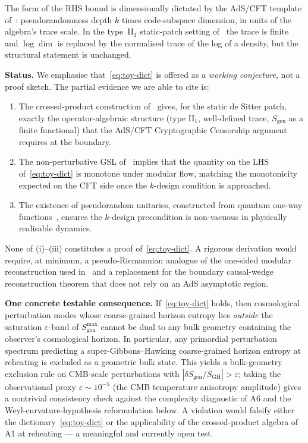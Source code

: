 \documentclass[epjc3,twocolumn]{svjour3}
\begin{document}
\noindent The form of the RHS bound is dimensionally dictated by the
AdS/CFT template of~\cite{CryptoCensorship}: pseudorandomness depth
$k$ times code-subspace dimension, in units of the algebra's trace
scale. In the type~II$_1$ static-patch setting of~\cite{CLPW2023} the
trace is finite and $\log\dim$ is replaced by the normalised trace
of the log of a density, but the structural statement is unchanged.

\medskip\noindent\textbf{Status.}\;
We emphasise that~\eqref{eq:toy-dict} is offered as a \emph{working
conjecture}, not a proof sketch. The partial evidence we are able to
cite is:
\begin{enumerate}
\item[(i)] The crossed-product construction
of~\cite{CLPW2023,DEHK2025a,DEHK2025b} gives, for the static de Sitter
patch, exactly the operator-algebraic structure (type II$_1$, well-defined
trace, $S_{\mathrm{gen}}$ as a finite functional) that the AdS/CFT
Cryptographic Censorship argument requires at the boundary.
\item[(ii)] The non-perturbative GSL of~\cite{FaulknerSperanza2024,Kirklin2025}
implies that the quantity on the LHS of~\eqref{eq:toy-dict} is monotone
under modular flow, matching the monotonicity expected on the CFT side
once the $k$-design condition is approached.
\item[(iii)] The existence of pseudorandom unitaries, constructed from
quantum one-way functions~\cite{MaHuang2025}, ensures the $k$-design
precondition is non-vacuous in physically realisable dynamics.
\end{enumerate}

None of (i)--(iii) constitutes a proof of~\eqref{eq:toy-dict}. A rigorous
derivation would require, at minimum, a pseudo-Riemannian analogue of
the one-sided modular reconstruction used in~\cite{CryptoCensorship}
and a replacement for the boundary causal-wedge reconstruction theorem
that does not rely on an AdS asymptotic region.

\medskip\noindent\textbf{One concrete testable consequence.}\;
If~\eqref{eq:toy-dict} holds, then cosmological perturbation modes whose
coarse-grained horizon entropy lies \emph{outside} the saturation
$\varepsilon$-band of $S_{\mathrm{gen}}^{\max}$ cannot be dual to any
bulk geometry containing the observer's cosmological horizon. In
particular, any primordial perturbation spectrum predicting a
super-Gibbons--Hawking coarse-grained horizon entropy at reheating is
excluded as a geometric bulk state. This yields a bulk-geometry
exclusion rule on CMB-scale perturbations with $|\delta S_{\mathrm{gen}}
/ S_{\mathrm{GH}}| > \varepsilon$; taking the observational proxy
$\varepsilon \sim 10^{-5}$ (the CMB temperature anisotropy amplitude)
gives a nontrivial consistency check against the complexity diagnostic of
A6 and the Weyl-curvature-hypothesis reformulation below. A violation
would falsify either the dictionary~\eqref{eq:toy-dict} or the
applicability of the crossed-product algebra of A1 at reheating --- a
meaningful and currently open test.
\end{document}
